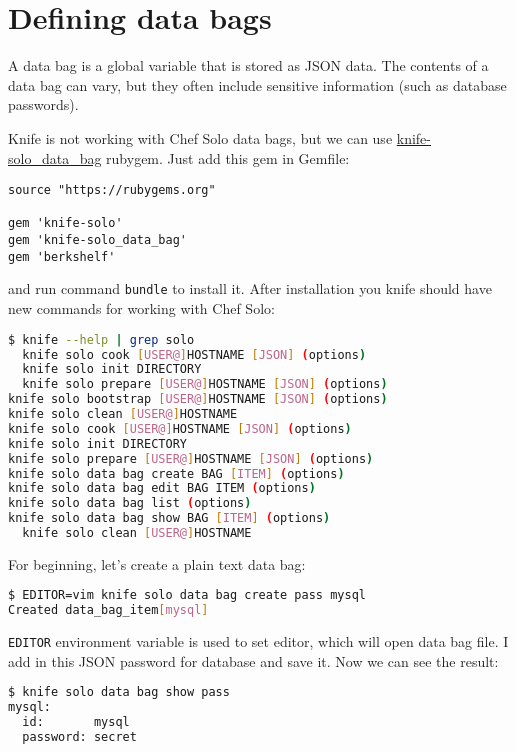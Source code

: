 \section{Defining data bags}
\label{sec:solo-data-bag}

A data bag is a global variable that is stored as JSON data. The contents of a data bag can vary, but they often include sensitive information (such as database passwords).

Knife is not working with Chef Solo data bags, but we can use \href{http://thbishop.com/knife-solo\_data\_bag/}{knife-solo\_data\_bag} rubygem. Just add this gem in Gemfile:

\begin{lstlisting}[label=lst:my-cloud-chef-databag1,title=my-cloud/Gemfile]
source "https://rubygems.org"

gem 'knife-solo'
gem 'knife-solo_data_bag'
gem 'berkshelf'
\end{lstlisting}

and run command \lstinline!bundle! to install it. After installation you knife should have new commands for working with Chef Solo:

\begin{lstlisting}[language=Bash,label=lst:my-cloud-chef-databag2]
$ knife --help | grep solo
  knife solo cook [USER@]HOSTNAME [JSON] (options)
  knife solo init DIRECTORY
  knife solo prepare [USER@]HOSTNAME [JSON] (options)
knife solo bootstrap [USER@]HOSTNAME [JSON] (options)
knife solo clean [USER@]HOSTNAME
knife solo cook [USER@]HOSTNAME [JSON] (options)
knife solo init DIRECTORY
knife solo prepare [USER@]HOSTNAME [JSON] (options)
knife solo data bag create BAG [ITEM] (options)
knife solo data bag edit BAG ITEM (options)
knife solo data bag list (options)
knife solo data bag show BAG [ITEM] (options)
  knife solo clean [USER@]HOSTNAME
\end{lstlisting}

For beginning, let's create a plain text data bag:

\begin{lstlisting}[language=Bash,label=lst:my-cloud-chef-databag3]
$ EDITOR=vim knife solo data bag create pass mysql
Created data_bag_item[mysql]
\end{lstlisting}

\lstinline!EDITOR! environment variable is used to set editor, which will open data bag file. I add in this JSON password for database and save it. Now we can see the result:

\begin{lstlisting}[language=Bash,label=lst:my-cloud-chef-databag4]
$ knife solo data bag show pass
mysql:
  id:       mysql
  password: secret
\end{lstlisting}

